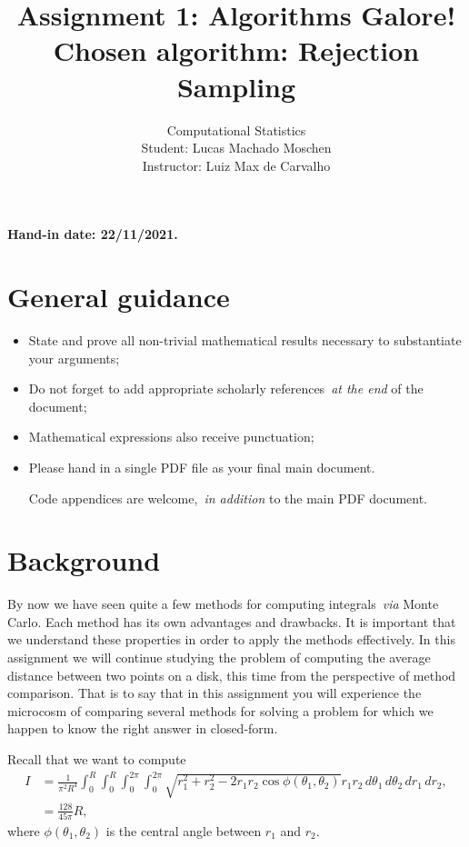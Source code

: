 \documentclass[a4paper,10pt, notitlepage]{report}
\title{Assignment 1: Algorithms Galore! \\\vspace{2mm}
       \normalsize Chosen algorithm: Rejection Sampling
}
\author{Computational Statistics \\ Student: Lucas Machado Moschen \\ Instructor: Luiz Max de Carvalho}
\begin{document}
\maketitle

\textbf{Hand-in date: 22/11/2021.}

\section*{General guidance}
\begin{itemize}
 \item State and prove all non-trivial mathematical results necessary to substantiate your arguments;
 \item Do not forget to add appropriate scholarly references~\textit{at the end} of the document;
 \item Mathematical expressions also receive punctuation;
 \item Please hand in a single PDF file as your final main document.
 
 Code appendices are welcome,~\textit{in addition} to the main PDF document.
 \end{itemize}

\newpage

\section*{Background}

By now we have seen quite a few methods for computing integrals~\textit{via} Monte Carlo.
Each method has its own advantages and drawbacks.
It is important that we understand these properties in order to apply the methods effectively. 
In this assignment we will continue studying the problem of computing the average distance between two points on a disk, this time from the perspective of method comparison.
That is to say that in this assignment you will experience the microcosm of comparing several methods for solving a problem for which we happen to know the right answer in closed-form.

Recall that we want to compute 
 \begin{align*}
  I &= \frac{1}{\pi^2 R^4}\int_{0}^{R}\int_{0}^{R}\int_{0}^{2\pi}\int_{0}^{2\pi}\sqrt{r_1^2 + r_2^2 - 2r_1r_2\cos\phi(\theta_1, \theta_2)}r_1r_2\,d\theta_1\,d\theta_2\,dr_1\,dr_2,\\
  &= \frac{128}{45\pi}R,
 \end{align*}
 where $\phi(\theta_1, \theta_2)$ is the central angle between $r_1$ and $r_2$.
 
\end{document}
